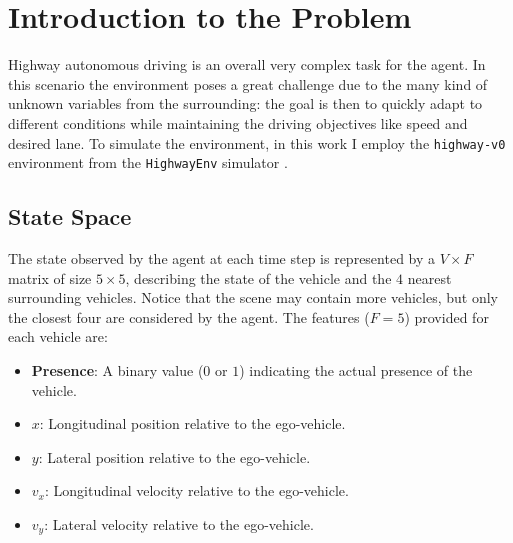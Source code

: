 \documentclass{article}
\begin{document}

\printAffiliationsAndNotice{} 

\begin{abstract}
This report explains the results obtained from the application of deep reinforcement learning algorithms for autonomous vehicle control in a highway scenario using the \texttt{HighwayEnv} simulator. I first define the kinematics of the problem and compare a simple DQN network against a deterministic and a human baseline. Then, to improve the performances of the first trained network, I modify different parameters such as reward function and network's structure in order to determine how these aspects contribute to the overall behaviour of the agent.
\end{abstract}

\section{Introduction to the Problem}

Highway autonomous driving is an overall very complex task for the agent. In this scenario the environment poses a great challenge due to the many kind of unknown variables from the surrounding: the goal is then to quickly adapt to different conditions while maintaining the driving objectives like speed and desired lane. To simulate the environment, in this work I employ the \texttt{highway-v0} environment from the \texttt{HighwayEnv} simulator \cite{highway-env}.
\subsection{State Space}
The state observed by the agent at each time step is represented by a $V \times F$ matrix of size $5 \times 5$, describing the state of the vehicle and the $4$ nearest surrounding vehicles. Notice that the scene may contain more vehicles, but only the closest four are considered by the agent. The features ($F = 5$) provided for each vehicle are:
\begin{itemize}
    \item \textbf{Presence}: A binary value ($0$ or $1$) indicating the actual presence of the vehicle.
    \item \textbf{$x$}: Longitudinal position relative to the ego-vehicle.
    \item \textbf{$y$}: Lateral position relative to the ego-vehicle.
    \item \textbf{$v_x$}: Longitudinal velocity relative to the ego-vehicle.
    \item \textbf{$v_y$}: Lateral velocity relative to the ego-vehicle.
\end{itemize}
\end{document}
